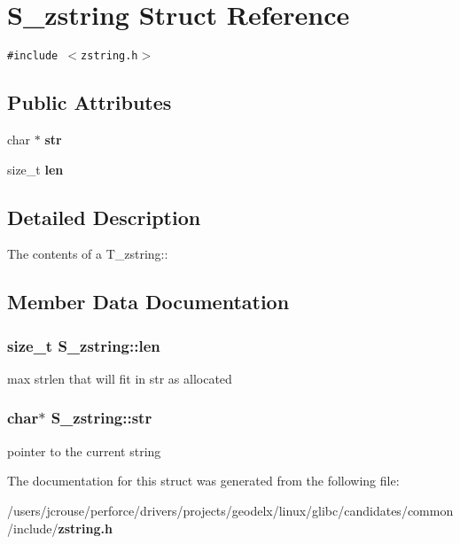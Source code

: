 \section{S\_\-zstring Struct Reference}
\label{structS__zstring}
{\tt \#include $<$zstring.h$>$}

\subsection*{Public Attributes}
\begin{CompactItemize}
\item 
char $\ast$ {\bf str}
\item 
size\_\-t {\bf len}
\end{CompactItemize}


\subsection{Detailed Description}
The contents of a T\_\-zstring:: 



\subsection{Member Data Documentation}
\subsubsection{\setlength{\rightskip}{0pt plus 5cm}size\_\-t S\_\-zstring::len}\label{structS__zstring_m1}


max strlen that will fit in str as allocated 
\subsubsection{\setlength{\rightskip}{0pt plus 5cm}char$\ast$ S\_\-zstring::str}\label{structS__zstring_m0}


pointer to the current string 

The documentation for this struct was generated from the following file:\begin{CompactItemize}
\item 
/users/jcrouse/perforce/drivers/projects/geodelx/linux/glibc/candidates/common/include/{\bf zstring.h}\end{CompactItemize}
